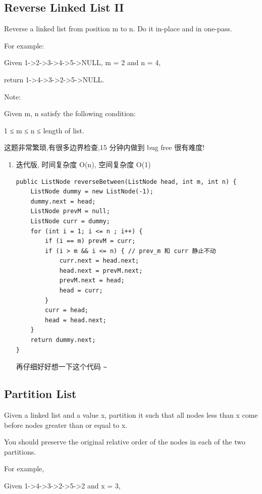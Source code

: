 \documentclass[12pt]{book}
\begin{document}
\subsection{Reverse Linked List II}
\label{sec-3-2-2}

Reverse a linked list from position m to n. Do it in-place and in one-pass.

For example:

Given 1->2->3->4->5->NULL, m = 2 and n = 4,

return 1->4->3->2->5->NULL.

Note:

Given m, n satisfy the following condition:

1 ≤ m ≤ n ≤ length of list.

这题非常繁琐,有很多边界检查,15 分钟内做到 bug free 很有难度!

\begin{enumerate}
\item 迭代版, 时间复杂度 O(n), 空间复杂度 O(1)
\label{sec-3-2-2-1}

\lstset{language=java,label= ,caption= ,numbers=none}
\begin{lstlisting}
public ListNode reverseBetween(ListNode head, int m, int n) {
    ListNode dummy = new ListNode(-1);
    dummy.next = head;
    ListNode prevM = null;
    ListNode curr = dummy;
    for (int i = 1; i <= n ; i++) {
        if (i == m) prevM = curr;
        if (i > m && i <= n) { // prev_m 和 curr 静止不动
            curr.next = head.next;
            head.next = prevM.next;
            prevM.next = head;
            head = curr;
        }
        curr = head;
        head = head.next;
    }
    return dummy.next;
}
\end{lstlisting}

再仔细好好想一下这个代码 \verb,~,
\end{enumerate}

\subsection{Partition List}
\label{sec-3-2-3}

Given a linked list and a value x, partition it such that all nodes less than x come before nodes greater than or equal to x.

You should preserve the original relative order of the nodes in each of the two partitions.

For example,

Given 1->4->3->2->5->2 and x = 3,
\end{document}
